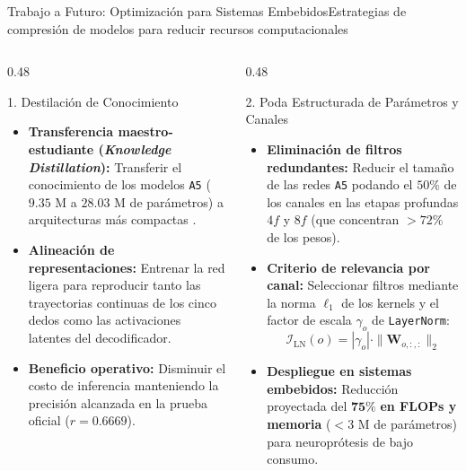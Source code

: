 \begin{frame}{Trabajo a Futuro: Optimizaci\'on para Sistemas Embebidos}{Estrategias de compresi\'on de modelos para reducir recursos computacionales \cite{Xie2026,rodas_valencia_tpe_ecog}}
  \begin{columns}[T,onlytextwidth]
    \begin{column}{0.48\textwidth}
      \begin{block}{1. Destilaci\'on de Conocimiento}
        \scriptsize
        \begin{itemize}\setlength{\itemsep}{4.5pt}
          \item \textbf{Transferencia maestro-estudiante (\textit{Knowledge Distillation}):} Transferir el conocimiento de los modelos \texttt{A5} ($9.35\text{ M}$ a $28.03\text{ M}$ de par\'ametros) a arquitecturas m\'as compactas \cite{Xie2026}.
          \item \textbf{Alineaci\'on de representaciones:} Entrenar la red ligera para reproducir tanto las trayectorias continuas de los cinco dedos como las activaciones latentes del decodificador.
          \item \textbf{Beneficio operativo:} Disminuir el costo de inferencia manteniendo la precisi\'on alcanzada en la prueba oficial ($r = 0.6669$).
        \end{itemize}
      \end{block}
    \end{column}

    \begin{column}{0.48\textwidth}
      \begin{alertblock}{2. Poda Estructurada de Par\'ametros y Canales}
        \scriptsize
        \begin{itemize}\setlength{\itemsep}{4pt}
          \item \textbf{Eliminaci\'on de filtros redundantes:} Reducir el tama\~no de las redes \texttt{A5} podando el $50\%$ de los canales en las etapas profundas $4f$ y $8f$ (que concentran $>72\%$ de los pesos).
          \item \textbf{Criterio de relevancia por canal:} Seleccionar filtros mediante la norma $\ell_1$ de los kernels y el factor de escala $\gamma_o$ de \texttt{LayerNorm}:
            \[
              \mathcal{I}_{\text{LN}}(o) = |\gamma_o| \cdot \|\mathbf{W}_{o,:,:}\|_2
            \]
          \item \textbf{Despliegue en sistemas embebidos:} Reducci\'on proyectada del $\mathbf{75\%}$ \textbf{en FLOPs y memoria} ($<3\text{ M}$ de par\'ametros) para neuropr\'otesis de bajo consumo.
        \end{itemize}
      \end{alertblock}
    \end{column}
  \end{columns}

\end{frame}
